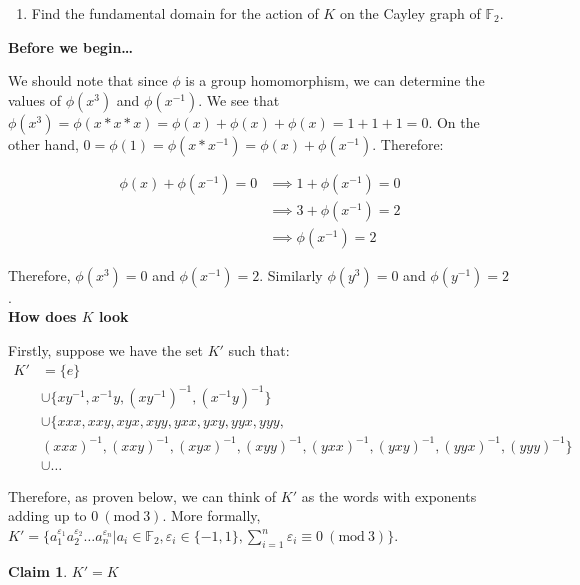 \documentclass[12pt]{article}%
\newtheorem{claim}[theorem]{Claim}
\newcommand{\F}{\mathbb{F}}
\newcommand{\Mod}[1]{\ (\mathrm{mod}\ #1)}
\begin{document}
\renewcommand{\labelenumi}{\alph{enumi}}
\begin{enumerate}
  \item Find the fundamental domain for the action of $K$ on the Cayley graph of $\F_2$.
\end{enumerate}

\textbf{Before we begin\ldots}

We should note that since $\phi$ is a group homomorphism, we can determine the values of $\phi(x^3)$ and
$\phi(x^{-1})$. We see that $\phi(x^3)=\phi(x*x*x)=\phi(x)+\phi(x)+\phi(x)=1+1+1=0$. On the other hand,
$0=\phi(1)=\phi(x*x^{-1})=\phi(x)+\phi(x^{-1})$. Therefore:

\begin{align*}
\phi(x)+\phi(x^{-1})=0
&\implies 1+\phi(x^{-1})=0\\
&\implies 3+\phi(x^{-1})=2\\
&\implies \phi(x^{-1})=2
\end{align*}

Therefore, $\phi(x^3)=0$ and $\phi(x^{-1})=2$.  Similarly  $\phi(y^3)=0$ and $\phi(y^{-1})=2$.\\

\textbf{How does $K$ look}

Firstly, suppose we have the set $K'$ such that:
\begin{align*}
K'
&=\{e\} \\
&\cup\{xy^{-1}, x^{-1}y, (xy^{-1})^{-1}, (x^{-1}y)^{-1}\} \\
&\cup\{xxx,xxy,xyx,xyy,yxx,yxy,yyx,yyy, \\
&(xxx)^{-1},(xxy)^{-1},(xyx)^{-1},(xyy)^{-1},(yxx)^{-1},(yxy)^{-1},(yyx)^{-1},(yyy)^{-1}\} \\
&\cup \ldots
\end{align*}

Therefore, as proven below, we can think of $K'$ as the words with exponents adding up to $0 \Mod{3}$.
More formally, $K'=\{a_{1}^{\varepsilon_1}a_{2}^{\varepsilon_2}\ldots a_{n}^{\varepsilon_n} | a_i\in \F_2,
\varepsilon_i\in \{-1, 1\}, \sum_{i=1}^{n} \varepsilon_i \equiv 0 \Mod{3}\}$. \\

\begin{claim}
$K'=K$
\end{claim}
\end{document}
